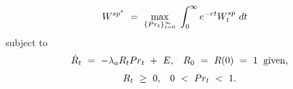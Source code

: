 \begin{equation}
\begin{split}
     W^{sp^{*}} \ 
     & = \ \underset{\{Pr_{t}\}_{t = 0}^{\infty}}{\max} \hspace{0.1cm} \int_{0}^{\infty} e^{-rt} W_{t}^{sp} \ dt
\end{split}
\label{Equation:Social-Planners-Problem_Formulation}
\end{equation}
subject to
\begin{equation}
\begin{split}
    \dot{R}_{t} \ = \ -\lambda_{a} R_{t} Pr_{t} \ + \ E, \hspace{0.3cm} R_{0} \ = \ R(0) \ = \ 1 \hspace{0.2cm} \text{given,}
\end{split}
\label{Equation:Social-Planners-Problem_Law-of-Motion}
\end{equation}
\begin{equation}
\begin{split}
    R_{t} \ \geq \ 0, \hspace{0.3cm} 0 \ < \ Pr_{t} \ < \ 1.
\end{split}
\end{equation}
